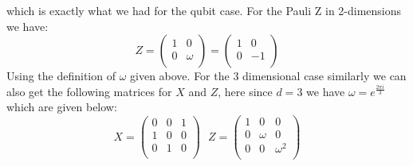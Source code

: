 \documentclass{article}
\begin{document}
which is exactly what we had for the qubit case. For the Pauli Z in 2-dimensions we have:
\[
Z=
\begin{pmatrix}
1 & 0\\
0 & \omega\\
\end{pmatrix}
=
\begin{pmatrix}
1 & 0\\
0 & -1\\
\end{pmatrix}
\]
Using the definition of $\omega$ given above.
For the $3$ dimensional case similarly we can also get the following matrices for $X$ and $Z$, here since $d=3$ we have $\omega=e^\frac{2\pi{i}}{3}$ which are given below:
\[
X=
\begin{pmatrix}
0 & 0 & 1\\
1 & 0 & 0\\
0 & 1 & 0\\
\end{pmatrix}~~~
Z= 
\begin{pmatrix}
1 & 0 & 0\\
0 & \omega & 0\\
0 & 0 & \omega^{2}\\
\end{pmatrix}
\]
\end{document}

